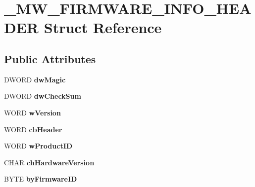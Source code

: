 \hypertarget{struct__MW__FIRMWARE__INFO__HEADER}{\section{\-\_\-\-M\-W\-\_\-\-F\-I\-R\-M\-W\-A\-R\-E\-\_\-\-I\-N\-F\-O\-\_\-\-H\-E\-A\-D\-E\-R Struct Reference}
\label{struct__MW__FIRMWARE__INFO__HEADER}
}
\subsection*{Public Attributes}
\begin{DoxyCompactItemize}
\item 
\hypertarget{struct__MW__FIRMWARE__INFO__HEADER_a31ed65cade907d1794ed828607a3a106}{D\-W\-O\-R\-D {\bfseries dw\-Magic}}\label{struct__MW__FIRMWARE__INFO__HEADER_a31ed65cade907d1794ed828607a3a106}

\item 
\hypertarget{struct__MW__FIRMWARE__INFO__HEADER_ad6c332250ec962fa9cecf26cda6aca5e}{D\-W\-O\-R\-D {\bfseries dw\-Check\-Sum}}\label{struct__MW__FIRMWARE__INFO__HEADER_ad6c332250ec962fa9cecf26cda6aca5e}

\item 
\hypertarget{struct__MW__FIRMWARE__INFO__HEADER_a66bc45fed488c9f1917e127bf2fd8fa5}{W\-O\-R\-D {\bfseries w\-Version}}\label{struct__MW__FIRMWARE__INFO__HEADER_a66bc45fed488c9f1917e127bf2fd8fa5}

\item 
\hypertarget{struct__MW__FIRMWARE__INFO__HEADER_a48f092d6295ad4f238194037530888f0}{W\-O\-R\-D {\bfseries cb\-Header}}\label{struct__MW__FIRMWARE__INFO__HEADER_a48f092d6295ad4f238194037530888f0}

\item 
\hypertarget{struct__MW__FIRMWARE__INFO__HEADER_a953c1211c030333f00cd6087718dbf8f}{W\-O\-R\-D {\bfseries w\-Product\-I\-D}}\label{struct__MW__FIRMWARE__INFO__HEADER_a953c1211c030333f00cd6087718dbf8f}

\item 
\hypertarget{struct__MW__FIRMWARE__INFO__HEADER_a06a0a67b0eefc2448a77eebd8189aecf}{C\-H\-A\-R {\bfseries ch\-Hardware\-Version}}\label{struct__MW__FIRMWARE__INFO__HEADER_a06a0a67b0eefc2448a77eebd8189aecf}

\item 
\hypertarget{struct__MW__FIRMWARE__INFO__HEADER_a6fa42047d8c99ef1d705a4b0652c75e2}{B\-Y\-T\-E {\bfseries by\-Firmware\-I\-D}}\label{struct__MW__FIRMWARE__INFO__HEADER_a6fa42047d8c99ef1d705a4b0652c75e2}


\end{DoxyCompactItemize}
